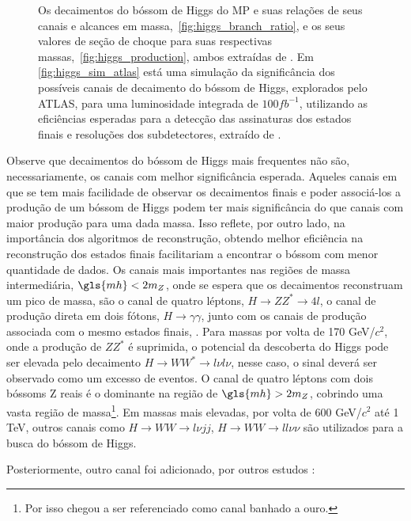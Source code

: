 \begin{figure}[ht!]
\begin{center}
{        }
    \end{center}
\caption[Simulação da significância dos canais de decaimento do bóssom
de Higgs explorados pelos ATLAS, as relações de seus canais e alcances em massa,
e a seção de choque do mesmo.]
{Os decaimentos do bóssom de Higgs do MP e suas relações de
seus canais e alcances em massa,~\ref{fig:higgs_branch_ratio}, e os seus valores de seção de choque para suas
respectivas massas,~\ref{fig:higgs_production}, ambos extraídas de \cite{lhc_higgs_group}. 
Em \ref{fig:higgs_sim_atlas} está uma simulação da significância dos possíveis canais de decaimento do
bóssom de Higgs, explorados pelo ATLAS, para uma luminosidade integrada de
$100fb^{-1}$, utilizando as eficiências esperadas para a detecção das
assinaturas dos estados finais e resoluções dos subdetectores, extraído de
\cite{ATLAS_TDR2}.}
\end{figure}

Observe que decaimentos do bóssom de Higgs mais frequentes não são,
necessariamente, os canais com melhor significância esperada. Aqueles canais em
que se tem mais facilidade de observar os decaimentos finais e poder associá-los
a produção de um bóssom de Higgs podem ter mais significância do que canais com
maior produção para uma dada massa. Isso reflete, por outro lado, na importância
dos algoritmos de reconstrução, obtendo melhor eficiência na reconstrução dos
estados finais facilitariam a encontrar o bóssom com menor quantidade de dados.
Os canais mais importantes nas regiões de massa intermediária, $\gls{mh}<2m_Z$,
onde se espera que os decaimentos reconstruam um pico de massa, são 
o canal de quatro léptons, $H\rightarrow ZZ^* \rightarrow 4l$, o canal de
produção direta em dois fótons, $H\rightarrow \gamma\gamma$, junto com os
canais de produção associada com o mesmo estados finais, . Para massas por volta
de 170 GeV/$c^2$, onde a produção de $ZZ^*$ é suprimida, o potencial da descoberta do
Higgs pode ser elevada pelo decaimento $H\rightarrow WW^*\rightarrow l\nu l\nu$,
nesse caso, o sinal deverá ser observado como um excesso de eventos. O canal de
quatro léptons com dois bóssoms Z reais é o dominante na região de
$\gls{mh}>2m_Z$, cobrindo uma vasta região de massa\footnote{Por isso chegou a
ser referenciado como canal banhado a ouro.}. Em massas mais elevadas, por volta de 600 GeV/$c^2$ até 1
TeV, outros canais como $H\rightarrow WW\rightarrow l\nu jj$, $H\rightarrow
WW\rightarrow ll\nu\nu$ são utilizados para a busca do bóssom de Higgs.

Posteriormente, outro canal foi adicionado, por outros estudos
\cite{atlas_tautau,atlas_tautau2}:

